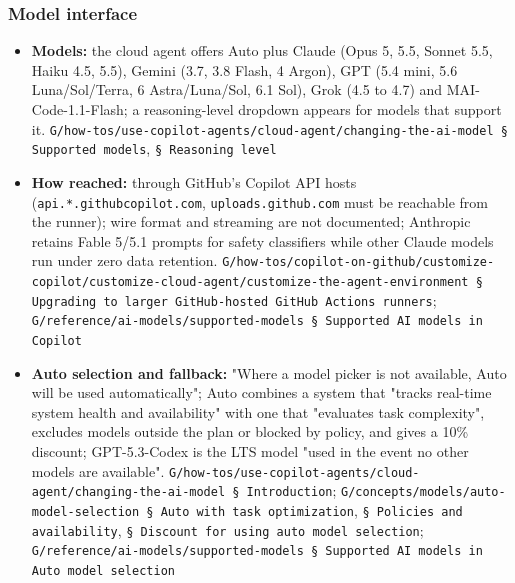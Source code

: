 \subsubsection*{Model interface}
\begin{itemize}
\item \textbf{Models:} the cloud agent offers Auto plus Claude (Opus 5, 5.5, Sonnet 5.5, Haiku 4.5, 5.5), Gemini (3.7, 3.8 Flash, 4 Argon), GPT (5.4 mini, 5.6 Luna/Sol/Terra, 6 Astra/Luna/Sol, 6.1 Sol), Grok (4.5 to 4.7) and MAI-Code-1.1-Flash; a reasoning-level dropdown appears for models that support it. \texttt{G/\allowbreak{}how-\allowbreak{}tos/\allowbreak{}use-\allowbreak{}copilot-\allowbreak{}agents/\allowbreak{}cloud-\allowbreak{}agent/\allowbreak{}changing-\allowbreak{}the-\allowbreak{}ai-\allowbreak{}model § Supported models}, \texttt{§ Reasoning level}
\item \textbf{How reached:} through GitHub's Copilot API hosts (\texttt{api.\allowbreak{}*.\allowbreak{}githubcopilot.\allowbreak{}com}, \texttt{uploads.\allowbreak{}github.\allowbreak{}com} must be reachable from the runner); wire format and streaming are not documented; Anthropic retains Fable 5/5.1 prompts for safety classifiers while other Claude models run under zero data retention. \texttt{G/\allowbreak{}how-\allowbreak{}tos/\allowbreak{}copilot-\allowbreak{}on-\allowbreak{}github/\allowbreak{}customize-\allowbreak{}copilot/\allowbreak{}customize-\allowbreak{}cloud-\allowbreak{}agent/\allowbreak{}customize-\allowbreak{}the-\allowbreak{}agent-\allowbreak{}environment § Upgrading to larger GitHub-\allowbreak{}hosted GitHub Actions runners}; \texttt{G/\allowbreak{}reference/\allowbreak{}ai-\allowbreak{}models/\allowbreak{}supported-\allowbreak{}models § Supported AI models in Copilot}
\item \textbf{Auto selection and fallback:} "Where a model picker is not available, Auto will be used automatically"; Auto combines a system that "tracks real-time system health and availability" with one that "evaluates task complexity", excludes models outside the plan or blocked by policy, and gives a 10\% discount; GPT-5.3-Codex is the LTS model "used in the event no other models are available". \texttt{G/\allowbreak{}how-\allowbreak{}tos/\allowbreak{}use-\allowbreak{}copilot-\allowbreak{}agents/\allowbreak{}cloud-\allowbreak{}agent/\allowbreak{}changing-\allowbreak{}the-\allowbreak{}ai-\allowbreak{}model § Introduction}; \texttt{G/\allowbreak{}concepts/\allowbreak{}models/\allowbreak{}auto-\allowbreak{}model-\allowbreak{}selection § Auto with task optimization}, \texttt{§ Policies and availability}, \texttt{§ Discount for using auto model selection}; \texttt{G/\allowbreak{}reference/\allowbreak{}ai-\allowbreak{}models/\allowbreak{}supported-\allowbreak{}models § Supported AI models in Auto model selection}

\end{itemize}
